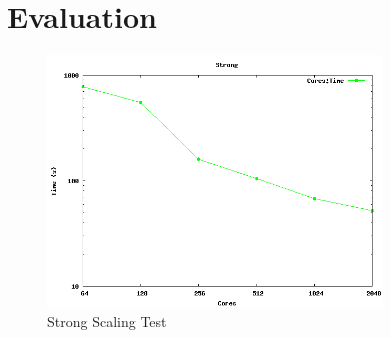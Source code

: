 \section{Evaluation}
\label{section:evaluation}

\begin{figure}[!t]
\center
\includegraphics[width=3.5in]{plots/strong}
\caption{Strong Scaling Test}
\label{fig:strong}
\end{figure}
